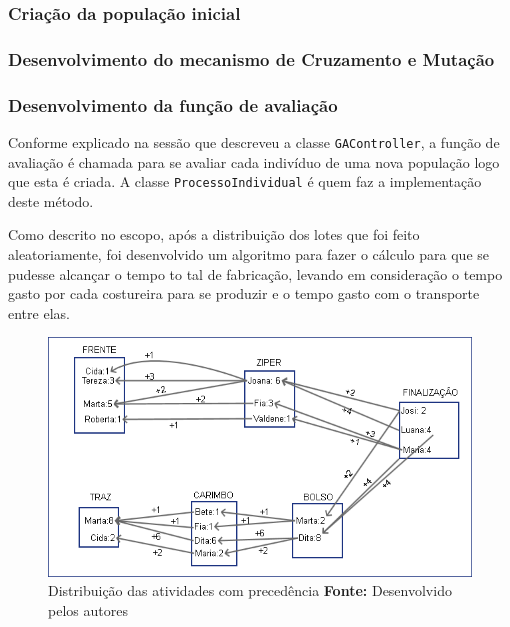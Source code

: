 \subsubsection{Criação da população inicial}



\subsubsection{Desenvolvimento do mecanismo de Cruzamento e Mutação}



\subsubsection{Desenvolvimento da função de avaliação}
\par Conforme explicado na sessão que descreveu a classe \texttt{GAController}, a função de avaliação é chamada para se
avaliar cada indivíduo de uma nova população logo que esta é criada. A classe \texttt{ProcessoIndividual} é quem faz a 
implementação deste método.

\par Como descrito no escopo, após a distribuição dos lotes que foi feito aleatoriamente, foi desenvolvido
um algoritmo para fazer o cálculo para que se pudesse alcançar o tempo to tal de fabricação, levando em consideração 
o tempo gasto por cada costureira para se produzir e o tempo gasto com o transporte entre elas.  



 \begin{figure}[h!]
 	\centerline{\includegraphics[scale=0.7]{./imagens/distribuicao_ilustracao.png}}
 	\caption[Distribuição de trabalho]
 	{Distribuição das atividades com precedência \textbf{Fonte:} Desenvolvido pelos autores}
 	\label{fig:exemplo1}
 \end{figure}
 
